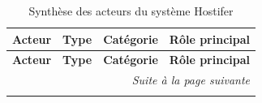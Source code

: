 \setlength{\LTleft}{0pt}
\setlength{\LTright}{0pt}
\renewcommand{\arraystretch}{1.3}
\begin{longtable}{|p{3.2cm}|p{2.2cm}|p{2.2cm}|p{5.5cm}|}
\caption{Synthèse des acteurs du système Hostifer}
\label{tab:acteurs} \\
\hline
\textbf{Acteur} & \textbf{Type} & \textbf{Catégorie} & \textbf{Rôle principal} \\
\hline
\endfirsthead

\hline
\textbf{Acteur} & \textbf{Type} & \textbf{Catégorie} & \textbf{Rôle principal} \\
\hline
\endhead

\hline
\multicolumn{4}{r|}{\small\textit{Suite à la page suivante}} \\
\endfoot

\hline
\endlastfoot


\end{longtable}
